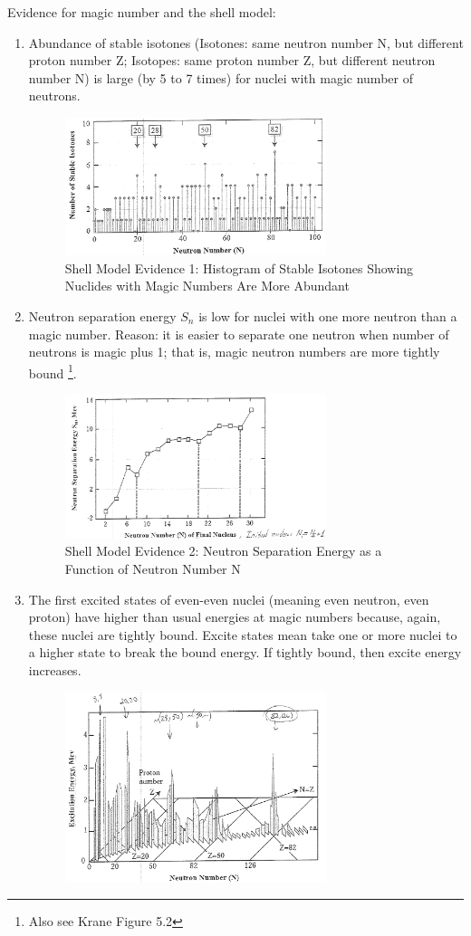 \documentclass{school-22.101-notes}
\begin{document}
Evidence for magic number and the shell model:
\begin{enumerate}
\item Abundance of stable isotones (Isotones: same neutron number N, but different proton number Z; Isotopes: same proton number Z, but different neutron number N) is large (by 5 to 7 times) for nuclei with magic number of neutrons.
\begin{figure}[ht]
    \centering
    \includegraphics[width=3in]{images/shell/shell-evidence-1.png}
    \caption{Shell Model Evidence 1: Histogram of Stable Isotones Showing Nuclides with Magic Numbers Are More Abundant}
\end{figure}
\item Neutron separation energy $S_n$ is low for nuclei with one more neutron than a magic number. Reason: it is easier to separate one neutron when number of neutrons is magic plus 1; that is, magic neutron numbers are more tightly bound \footnote{Also see Krane Figure 5.2}. 
\begin{figure}[ht]
    \centering
    \includegraphics[width=3in]{images/shell/shell-evidence-2.png}
    \caption{Shell Model Evidence 2: Neutron Separation Energy as a Function of Neutron Number N}
\end{figure}
\item The first excited states of even-even nuclei (meaning even neutron, even proton) have higher than usual energies at magic numbers because, again, these nuclei are tightly bound. Excite states mean take one or more nuclei to a higher state to break the bound energy. If tightly bound, then excite energy increases. 
\begin{figure}
    \centering
    \includegraphics[width=3in]{images/shell/shell-evidence-3.png}

\end{figure}
\end{enumerate}
\end{document}
